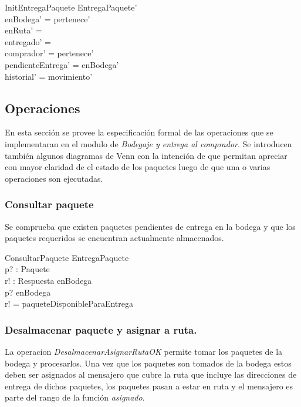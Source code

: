 \documentclass[12pt,a4paper]{article}
\begin{document}
\begin{schema}{InitEntregaPaquete}
EntregaPaquete'\\
\where
enBodega' = \dom pertenece'\\
enRuta' = \emptyset\\
entregado' = \emptyset\\
comprador' = \ran pertenece'\\
pendienteEntrega' = enBodega'\\
historial' = \ran movimiento'
\end{schema}

\subsection{Operaciones}

En esta sección se provee la especificación formal de las operaciones que se implementaran en el modulo de \textit{Bodegaje y entrega al comprador}. Se introducen también algunos diagramas de Venn con la intención de que permitan apreciar con mayor claridad de el estado de los paquetes luego de que una o varias operaciones son ejecutadas.

\subsubsection{Consultar paquete}

Se comprueba que existen paquetes pendientes de entrega en la bodega y que los paquetes requeridos se encuentran actualmente almacenados.

\begin{schema}{ConsultarPaquete}
\Xi EntregaPaquete\\
p? : Paquete\\
r! : Respuesta
\where
enBodega \neq \emptyset\\
p? \in enBodega\\
r! = paqueteDisponibleParaEntrega
\end{schema}

\subsubsection{Desalmacenar paquete y asignar a ruta.}

La operacion \textit{DesalmacenarAsignarRutaOK} permite tomar los paquetes de la bodega y procesarlos. Una vez que los paquetes son tomados de la bodega estos deben ser asignados al mensajero que cubre la ruta que incluye las direcciones de entrega de dichos paquetes, los paquetes pasan a estar en ruta y el mensajero es parte del rango de la función \textit{asignado}.
\end{document}
